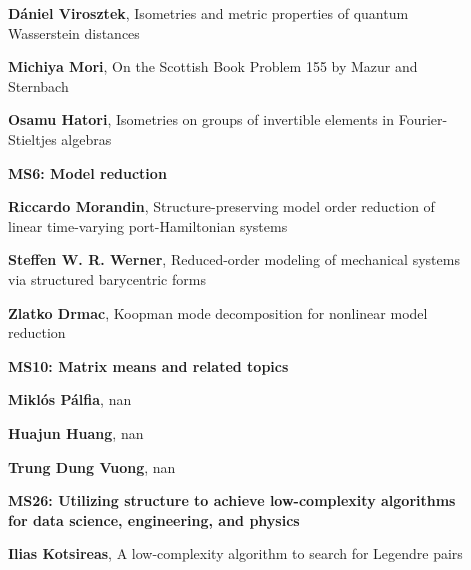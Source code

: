 \documentclass[ILAS2025-program.tex]{subfiles}
\begin{document}
\begin{description}
\begin{description}
    \item[] \textbf{Dániel Virosztek}, Isometries and metric properties of quantum Wasserstein distances
        \item[] \textbf{Michiya Mori}, On the Scottish Book Problem 155 by Mazur and Sternbach
        \item[] \textbf{Osamu Hatori}, Isometries on groups of invertible elements in Fourier-Stieltjes algebras
        \end{description}
    \begin{description}
    \item[] {\color{mstitle}\textbf{MS6: Model reduction}} 
    \item[] \textbf{Riccardo Morandin}, Structure-preserving model order reduction of linear time-varying port-Hamiltonian systems
        \item[] \textbf{Steffen W. R. Werner}, Reduced-order modeling of mechanical systems via structured barycentric forms
        \item[] \textbf{Zlatko Drmac}, Koopman mode decomposition for nonlinear model reduction
        \end{description}
    \begin{description}
    \item[] {\color{mstitle}\textbf{MS10: Matrix means and related topics}} 
    \item[] \textbf{Miklós Pálfia}, nan
        \item[] \textbf{Huajun Huang}, nan
        \item[] \textbf{Trung Dung Vuong}, nan
        \end{description}
    \begin{description}
    \item[] {\color{mstitle}\textbf{MS26: Utilizing structure to achieve low-complexity algorithms for data science, engineering, and physics}} 
    \item[] \textbf{Ilias Kotsireas}, A low-complexity algorithm to search for Legendre pairs


\end{description}
\end{description}
\end{document}
